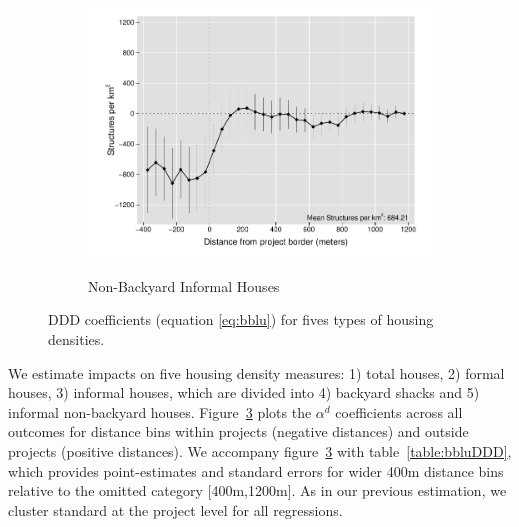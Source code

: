 \documentclass[12pt]{article}
\begin{document}
\begin{figure}[t!]
\begin{subfigure}[b]{0.49\textwidth}
        \label{fig:DDDbackyard}
    \end{subfigure}
    \vskip 1mm \vskip 0pt
    \begin{subfigure}[b]{.49\textwidth}  
        \centering
        \caption[]{\small Non-Backyard Informal Houses} 
        \vspace{-1mm}
        \includegraphics[width=\textwidth,trim={.5cm .3cm .3cm 0cm}, clip=true]{figures/distplotDDD_bblu_inf_non_backyard_admin}    
        \label{fig:DDDnonbackyard}
    \end{subfigure}
    \hfill \hspace{.02\textwidth}
    \begin{minipage}{0.47\textwidth}   
    \vspace{-6cm}
    \caption[]
    {\small DDD coefficients (equation \ref{eq:bblu}) for fives types of housing densities.} \label{fig:DDDbblu}
	\end{minipage}
\end{figure} 

We estimate impacts on five housing density measures: 1) total houses, 2) formal houses, 3) informal houses, which are divided into 4) backyard shacks and 5) informal non-backyard houses.  Figure~\ref{fig:DDDbblu} plots the $\alpha^{d}$ coefficients across all outcomes for distance bins within projects (negative distances) and outside projects (positive distances). We accompany figure~\ref{fig:DDDbblu} with table~\ref{table:bbluDDD}, which provides point-estimates and standard errors for wider 400m distance bins relative to the omitted category [400m,1200m]. As in our previous estimation, we cluster standard at the project level for all regressions.
\end{document}
